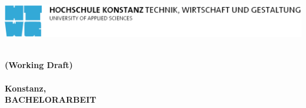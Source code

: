 
\begin{titlepage}

\vspace*{-3.5cm}

\begin{flushleft}
\hspace*{-1cm} \includegraphics[width=15.7cm]{titlepages/htwg-logo}
\end{flushleft}

\vspace{2.5cm}

\begin{center}
	\huge{
		\textbf{\thema} \\[4cm]
	}
\normalsize{\textbf{(Working Draft)} \\}
	\Large{
		\textbf{\autor}} \\[4cm]
	\large{
		\textbf{Konstanz, \abgabedatum} \\[1cm]
	}
	\Huge{
		\textbf{{\sf BACHELORARBEIT}}
	}
\end{center}

\end{titlepage}
